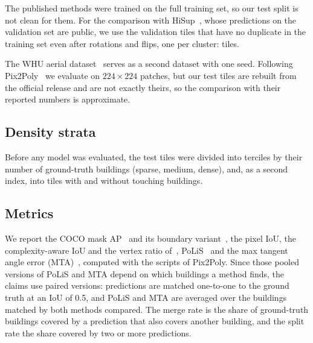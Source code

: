 \documentclass[conference]{IEEEtran}
\begin{document}
The published methods were trained on the full training set, so our test split is not clean for them. For the
comparison with HiSup~\cite{xu2023hisup}, whose predictions on the validation set are public, we use the validation
tiles that have no duplicate in the training set even after rotations and flips, one per cluster: \NTilesClean{} tiles.

The WHU aerial dataset~\cite{ji2019whu} serves as a second dataset with one seed. Following
Pix2Poly~\cite{adimoolam2025pix2poly} we evaluate on $224\times224$ patches, but our test tiles are rebuilt from the
official release and are not exactly theirs, so the comparison with their reported numbers is approximate.

\subsection{Density strata}
Before any model was evaluated, the test tiles were divided into terciles by their number of ground-truth buildings
(sparse, medium, dense), and, as a second index, into tiles with and without touching buildings.

\subsection{Metrics}
We report the COCO mask AP~\cite{lin2014coco} and its boundary variant~\cite{cheng2021boundaryiou}, the pixel IoU, the
complexity-aware IoU and the vertex ratio of~\cite{zorzi2022polyworld}, PoLiS~\cite{avbelj2015polis} and the max tangent
angle error (MTA)~\cite{girard2021ffl}, computed with the scripts of Pix2Poly. Since those pooled versions of PoLiS and
MTA depend on which buildings a method finds, the claims use paired versions: predictions are matched one-to-one to the
ground truth at an IoU of 0.5, and PoLiS and MTA are averaged over the buildings matched by both methods compared. The
merge rate is the share of ground-truth buildings covered by a prediction that also covers another building, and the
split rate the share covered by two or more predictions.
\end{document}
